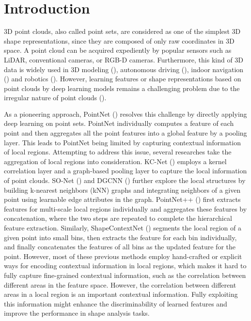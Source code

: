 \documentclass[letterpaper]{article}
\begin{document}
\section{Introduction}
3D point clouds, also called point sets, are considered as one of the simplest 3D shape representations, since they are composed of only raw coordinates in 3D space.
A point cloud can be acquired expediently by popular sensors such as LiDAR, conventional cameras, or RGB-D cameras. 
Furthermore, this kind of 3D data is widely used in 3D modeling (\citealt{golovinskiy2009shape}), autonomous driving (\citealt{qi2017frustum}), indoor navigation (\citealt{zhu2017target}) and robotics (\citealt{wang2015voting}).
However, learning features or shape representations based on point clouds by deep learning models remains a challenging problem due to the irregular nature of point clouds (\citealt{qi2017pointnet}).


As a pioneering approach, PointNet (\citealt{qi2017pointnet}) resolves this challenge by directly applying deep learning on point sets.
PointNet individually computes a feature of each point and then aggregates all the point features into a global feature by a pooling layer.
This leads to PointNet being limited by capturing contextual information of local regions.
Attempting to address this issue, several researches take the aggregation of local regions into consideration.
KC-Net (\citealt{shen2018mining}) employs a kernel correlation layer and a graph-based pooling layer to capture the local information of point clouds.
SO-Net (\citealt{li2018so}) and DGCNN (\citealt{wang2018dynamic}) further explore the local structures by building k-nearest neighbors (kNN) graphs and integrating neighbors of a given point using learnable edge attributes in the graph.
PointNet++ (\citealt{qi2017pointnet++}) first extracts features for multi-scale local regions individually and aggregates these features by concatenation, where the two steps are repeated to complete the hierarchical feature extraction.
Similarly, ShapeContextNet (\citealt{xie2018attentional}) segments the local region of a given point into small bins, then extracts the feature for each bin individually, and finally concatenates the features of all bins as the updated feature for the point.
However, most of these previous methods employ hand-crafted or explicit ways for encoding contextual information in local regions, which makes it hard to fully capture fine-grained contextual information, such as the correlation between different areas in the feature space. 
However, the correlation between different areas in a local region is an important contextual information. Fully exploiting this information might enhance the discriminability of learned features and improve the performance in shape analysis tasks.
\end{document}
